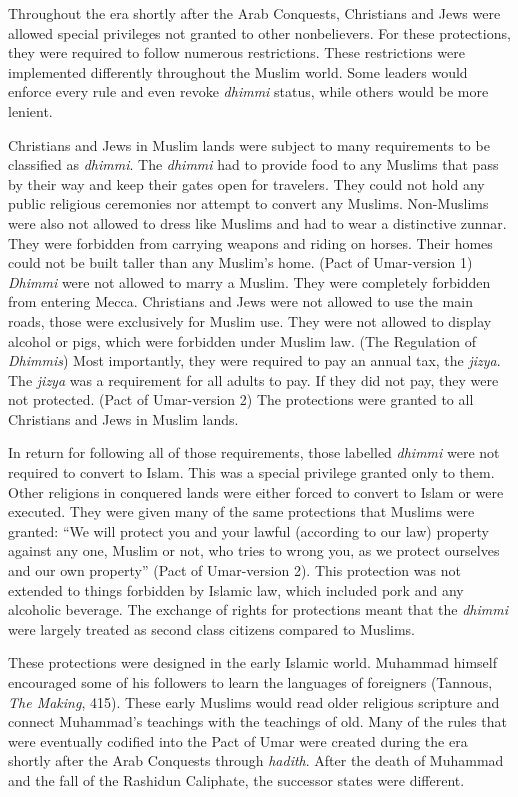 \documentclass[12pt]{article}
\begin{document}
Throughout the era shortly after the Arab Conquests, Christians and Jews were allowed special privileges not granted to other nonbelievers.
For these protections, they were required to follow numerous restrictions.
These restrictions were implemented differently throughout the Muslim world.
Some leaders would enforce every rule and even revoke \emph{dhimmi} status, while others would be more lenient.

Christians and Jews in Muslim lands were subject to many requirements to be classified as \emph{dhimmi}.
The \emph{dhimmi} had to provide food to any Muslims that pass by their way and keep their gates open for travelers.
They could not hold any public religious ceremonies nor attempt to convert any Muslims.
Non-Muslims were also not allowed to dress like Muslims and had to wear a distinctive zunnar.
They were forbidden from carrying weapons and riding on horses.
Their homes could not be built taller than any Muslim's home.
(Pact of Umar-version 1) \emph{Dhimmi} were not allowed to marry a Muslim.
They were completely forbidden from entering Mecca.
Christians and Jews were not allowed to use the main roads, those were exclusively for Muslim use.
They were not allowed to display alcohol or pigs, which were forbidden under Muslim law.
(The Regulation of \emph{Dhimmis}) Most importantly, they were required to pay an annual tax, the \emph{jizya}.
The \emph{jizya} was a requirement for all adults to pay.
If they did not pay, they were not protected. (Pact of Umar-version 2)
The protections were granted to all Christians and Jews in Muslim lands.

In return for following all of those requirements, those labelled \emph{dhimmi} were not required to convert to Islam.
This was a special privilege granted only to them.
Other religions in conquered lands were either forced to convert to Islam or were executed.
They were given many of the same protections that Muslims were granted: ``We will protect you and your lawful (according to our law) property against any one, Muslim or not, who tries to wrong you, as we protect ourselves and our own property'' (Pact of Umar-version 2).
This protection was not extended to things forbidden by Islamic law, which included pork and any alcoholic beverage.
The exchange of rights for protections meant that the \emph{dhimmi} were largely treated as second class citizens compared to Muslims.

These protections were designed in the early Islamic world.
Muhammad himself encouraged some of his followers to learn the languages of foreigners (Tannous, \emph{The Making}, 415).
These early Muslims would read older religious scripture and connect Muhammad's teachings with the teachings of old.
Many of the rules that were eventually codified into the Pact of Umar were created during the era shortly after the Arab Conquests through \emph{hadith}.
After the death of Muhammad and the fall of the Rashidun Caliphate, the successor states were different.
\end{document}
